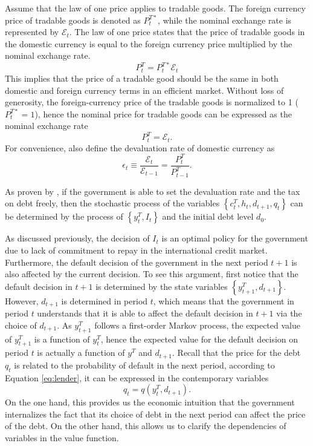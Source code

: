 Assume that the law of one price applies to tradable goods. The foreign currency price of tradable goods is denoted as $P^{T*}_t$, while the nominal exchange rate is represented by $\mathcal{E}_t$. The law of one price states that the price of tradable goods in the domestic currency is equal to the foreign currency price multiplied by the nominal exchange rate.
\begin{equation*}
    P^T_t = P^{T*}_t \mathcal{E}_t
\end{equation*}
This implies that the price of a tradable good should be the same in both domestic and foreign currency terms in an efficient market. Without loss of generosity, the foreign-currency price of the tradable goods is normalized to 1 ($P^{T*}_t = 1$), hence the nominal price for tradable goods can be expressed as the nominal exchange rate
\begin{equation}
    \label{eq:price-exrate}
    P^T_t = \mathcal{E}_t.
\end{equation}
For convenience, also define the devaluation rate of domestic currency as
\begin{equation}
    \label{eq:devaluation-rate}
    \epsilon_t \equiv \frac{\mathcal{E}_t}{\mathcal{E}_{t-1}} = \frac{P^T_t}{P^T_{t-1}}.
\end{equation}

As proven by \citet*{Na-18}, if the government is able to set the devaluation rate and the tax on debt freely, then the stochastic process of the variables $\left\{ c^T_t, h_t, d_{t+1}, q_t \right\}$ can be determined by the process of $\left\{ y^T_t, I_t\right\}$ and the initial debt level $d_0$.

As discussed previously, the decision of $I_t$ is an optimal policy for the government due to lack of commitment to repay in the international credit market. Furthermore, the default decision of the government in the next period $t+1$ is also affected by the current decision. To see this argument, first notice that the default decision in $t+1$ is determined by the state variables $\left\{ y^T_{t+1}, d_{t+1} \right\}$. However, $d_{t+1}$ is determined in period $t$, which means that the government in period $t$ understands that it is able to affect the default decision in $t+1$ via the choice of $d_{t+1}$. As $y^T_{t+1}$ follows a first-order Markov process, the expected value of $y^T_{t+1}$ is a function of $y^T_t$, hence the expected value for the default decision on period $t$ is actually a function of $y^T$ and $d_{t+1}$. Recall that the price for the debt $q_t$ is related to the probability of default in the next period, according to Equation \eqref{eq:lender}, it can be expressed in the contemporary variables
\begin{equation}
    q_t = q(y^T_t, d_{t+1}).
\end{equation}
On the one hand, this provides us the economic intuition that the government internalizes the fact that its choice of debt in the next period can affect the price of the debt. On the other hand, this allows us to clarify the dependencies of variables in the value function.